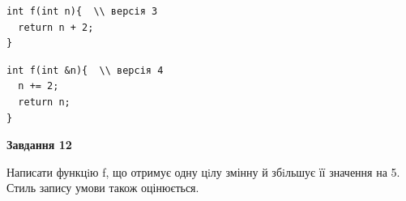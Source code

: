 \documentclass[12pt, ukrainian]{article}
\begin{document}
{\begin {large}
\begin{minipage}[t]{11.0cm}
\vspace{-8mm}\begin{verbatim}
int f(int n){  \\ версія 3
  return n + 2;
}
\end{verbatim}

\vspace{-8mm}\begin{verbatim}
int f(int &n){  \\ версія 4
  n += 2;
  return n;
}
\end{verbatim}



\begin{center}
\textbf{Завдання 12}
\end{center}

Написати функцiю f, що отримує одну цiлу змінну й збiльшує її значення на 5. Стиль запису умови також оцінюється.\par

\end{minipage}

\end {large}}
\newpage
\end{document}
